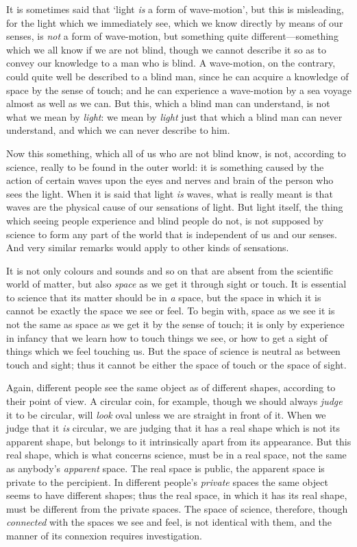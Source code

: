 \documentclass[oneside,letterpaper,12pt]{book}
\begin{document}
It is sometimes said that `light \emph{is} a form of
wave-motion', but this is misleading, for the light which
we immediately see, which we know directly by means of our senses, is
\emph{not} a form of wave-motion, but something quite
different---something which we all know if we are not blind, though we
cannot describe it so as to convey our knowledge to a man who is blind.
A wave-motion, on the contrary, could quite well be described to a blind
man, since he can acquire a knowledge of space by the sense of touch;
and he can experience a wave-motion by a sea voyage almost as well as we
can. But this, which a blind man can understand, is not what we mean by
\emph{light}: we mean by \emph{light} just that which a blind man can
never understand, and which we can never describe to him.

Now this something, which all of us who are not blind know, is not,
according to science, really to be found in the outer world: it is
something caused by the action of certain waves upon the eyes and nerves
and brain of the person who sees the light. When it is said that light
\emph{is} waves, what is really meant is that waves are the physical
cause of our sensations of light. But light itself, the thing which
seeing people experience and blind people do not, is not supposed by
science to form any part of the world that is independent of us and our
senses. \label{light} And very similar remarks would apply to other kinds of
sensations.

It is not only colours and sounds and so on that are absent from the
scientific world of matter, but also \emph{space} as we get it through
sight or touch. It is essential to science that its matter should be in
\emph{a} space, but the space in which it is cannot be exactly the space
we see or feel. To begin with, space as we see it is not the same as
space as we get it by the sense of touch; it is only by experience in
infancy that we learn how to touch things we see, or how to get a sight
of things which we feel touching us. But the space of science is neutral
as between touch and sight; thus it cannot be either the space of touch
or the space of sight.

Again, different people see the same object as of different shapes,
according to their point of view. A circular coin, for example, though
we should always \emph{judge} it to be circular, will \emph{look} oval
unless we are straight in front of it. When we judge that it \emph{is}
circular, we are judging that it has a real shape which is not its
apparent shape, but belongs to it intrinsically apart from its
appearance. But this real shape, which is what concerns science, must be
in a real space, not the same as anybody's
\emph{apparent} space. The real space is public, the apparent space is
private to the percipient. In different people's
\emph{private} spaces the same object seems to have different shapes;
thus the real space, in which it has its real shape, must be different
from the private spaces. The space of science, therefore, though
\emph{connected} with the spaces we see and feel, is not identical with
them, and the manner of its connexion requires investigation.
\end{document}
